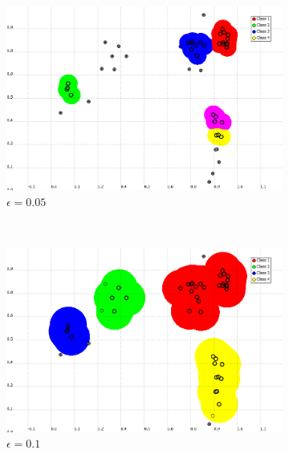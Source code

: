 \documentclass[a4paper,10pt]{article}
\begin{document}
\begin{figure}[H]
\centering
    \begin{subfigure}[t]{0.2\textwidth}
      \centering
      \includegraphics[width=\textwidth]{pictures/DBSCAN-Minpoint-2-epsilon005}
      \caption{$\epsilon = 0.05$}
      \label{fig:DBSCAN-Minpoint-2-epsilon005}
     \end{subfigure}
      ~
    \begin{subfigure}[t]{0.2\textwidth}
      \centering
      \includegraphics[width=\textwidth]{pictures/DBSCAN-Minpoint-2-epsilon01}
      \caption{$\epsilon = 0.1$}
      \label{fig:DBSCAN-Minpoint-2-epsilon01}
     \end{subfigure}
      ~
    \begin{subfigure}[t]{0.2\textwidth}
      \centering

\end{subfigure}
\end{figure}
\end{document}
